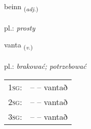 \documentclass[frontgrid, backgrid]{flacards}\usepackage[]{graphicx}\usepackage[]{xcolor}
\begin{document}
\renewcommand{\flhead}{\vskip5pt \fboxsep=0pt {\small\bfseries\footnotesize Lýsingarorð | przymiotnik}}
\renewcommand{\fcfoot}{\vskip5pt \fboxsep=0pt \hspace{2pt}{\small\bfseries\footnotesize 1K}}

\renewcommand{\blhead}{\vskip5pt {\small\bfseries\footnotesize Lýsingarorð | przymiotnik }}
\renewcommand{\bcfoot}{\vskip5pt \hspace{2pt}{\small\bfseries\footnotesize 1K}}


{beinn \small{\textsubscript{(\textit{adj.})}} \\[1ex] %
\textphonetic{[peitn̥]} \\
pl.: \emph{prosty} \\  [2ex]
\renewcommand*{\arraystretch}{0.8}
}

\renewcommand{\flhead}{\vskip5pt \fboxsep=0pt {\small\bfseries\footnotesize Sagnorð | czasownik}}
\renewcommand{\fcfoot}{\vskip5pt \fboxsep=0pt \hspace{2pt}{\small\bfseries\footnotesize 1K}}

\renewcommand{\blhead}{\vskip5pt {\small\bfseries\footnotesize Sagnorð | czasownik }}
\renewcommand{\bcfoot}{\vskip5pt \hspace{2pt}{\small\bfseries\footnotesize 1K}}


{vanta \small{\textsubscript{(\textit{v.})}} \\[1ex] %
\textphonetic{[van̥ta]} \\
pl.: \emph{brakować; potrzebować} \\  [2ex]
\renewcommand*{\arraystretch}{0.8}
\begin{tabular}{p{1cm}l}
\textsc{1sg}: &  --  -- vantað \\ 
\textsc{2sg}: &  --  -- vantað \\ 
\textsc{3sg}: &  --  -- vantað \\ 
\end{tabular}
}
\end{document}
